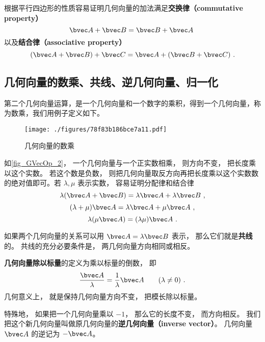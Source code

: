 根据平行四边形的性质容易证明几何向量的加法满足\textbf{交换律（commutative property）}
\begin{equation}
\bvec A + \bvec B = \bvec B + \bvec A~
\end{equation}
以及\textbf{结合律（associative property）}
\begin{equation}
(\bvec A + \bvec B) + \bvec C = \bvec A + (\bvec B + \bvec C)~.
\end{equation}

\subsection{几何向量的数乘、共线、逆几何向量、归一化}\label{sub_GVecOp_1}
第二个几何向量运算，是一个几何向量和一个数字的乘积，得到一个几何向量，称为数乘，我们用例子定义如下。

\begin{figure}[ht]
\centering
\texttt{[image: ./figures/78f83b186bce7a11.pdf]}
\caption{几何向量的数乘} \label{fig_GVecOp_2}
\end{figure}

如\autoref{fig_GVecOp_2}， 一个几何向量与一个正实数相乘， 则方向不变， 把长度乘以这个实数。 若这个数是负数， 则把几何向量取反方向再把长度乘以这个实数数的绝对值即可。若 $\lambda, \mu$ 表示实数， 容易证明分配律和结合律
\begin{equation}
\lambda(\bvec A + \bvec B) = \lambda\bvec A + \lambda\bvec B~,
\end{equation}
\begin{equation}
(\lambda+\mu)\bvec A = \lambda\bvec A + \mu\bvec A~,
\end{equation}
\begin{equation}
\lambda(\mu\bvec A) = (\lambda\mu) \bvec A~.
\end{equation}

如果两个几何向量的关系可以用 $\bvec A = \lambda\bvec B$ 表示， 那么它们就是\textbf{共线}的。 共线的充分必要条件是， 两几何向量方向相同或相反。

\textbf{几何向量除以标量}的定义为乘以标量的倒数， 即
\begin{equation}
\frac{\bvec A}{\lambda} = \frac{1}{\lambda} \bvec A \qquad (\lambda \ne 0)~.
\end{equation}
几何意义上， 就是保持几何向量方向不变， 把模长除以标量。

特殊地， 如果把一个几何向量乘以 $-1$， 那么它的长度不变， 而方向相反。 我们把这个新几何向量叫做原几何向量的\textbf{逆几何向量（inverse vector）}。 几何向量 $\bvec A$ 的逆记为 $-\bvec A$。

